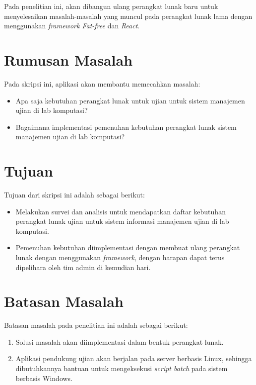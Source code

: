 Pada penelitian ini, akan dibangun ulang perangkat lunak baru untuk
menyelesaikan masalah-masalah yang muncul pada perangkat lunak lama dengan
menggunakan \textit{framework Fat-free} dan \textit{React}.

\section{Rumusan Masalah}
\label{sec:rumusan}
Pada skripsi ini, aplikasi akan membantu memecahkan masalah:
\begin{itemize}
    \item Apa saja kebutuhan perangkat lunak untuk ujian untuk sistem manajemen
    ujian di lab komputasi?
    
    \item Bagaimana implementasi pemenuhan kebutuhan perangkat lunak sistem
    manajemen ujian di lab komputasi?
\end{itemize}

\section{Tujuan}
\label{sec:tujuan}
Tujuan dari skripsi ini adalah sebagai berikut:
\begin{itemize}
    \item Melakukan survei dan analisis untuk mendapatkan daftar kebutuhan
        perangkat lunak ujian untuk sistem informasi manajemen ujian di lab
        komputasi.

    \item Pemenuhan kebutuhan diimplementasi dengan membuat ulang perangkat
        lunak dengan menggunakan \textit{framework}, dengan harapan dapat terus
        dipelihara oleh tim admin di kemudian hari.

\end{itemize}

\section{Batasan Masalah}
\label{sec:batasan}
Batasan masalah pada penelitian ini adalah sebagai berikut:
\begin{enumerate}
    \item Solusi masalah akan diimplementasi dalam bentuk perangkat lunak.
  
    \item Aplikasi pendukung ujian akan berjalan pada server berbasis Linux,
        sehingga dibutuhkannya bantuan untuk mengeksekusi \textit{script batch}
        pada sistem berbasis Windows.
\end{enumerate}

